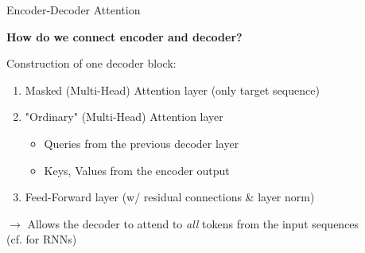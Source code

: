 
\begin{vbframe}{Encoder-Decoder Attention}

\vfill

\textbf{\ques How do we connect encoder and decoder?}\\

\vspace{.3cm}
	
Construction of one decoder block:

\vspace{.3cm}
	
	\begin{enumerate}
		\item Masked (Multi-Head) Attention layer (only target sequence)
		\item "Ordinary" (Multi-Head) Attention layer
			\begin{itemize}
				\item Queries from the previous decoder layer
				\item Keys, Values from the encoder output
			\end{itemize}
		\item Feed-Forward layer (w/ residual connections \& layer norm)
	\end{enumerate}
	
\vspace{.3cm}
	
$\to$ Allows the decoder to attend to \textit{all} tokens from the input sequences\\
(cf.  for RNNs)

\vfill

\end{vbframe}



